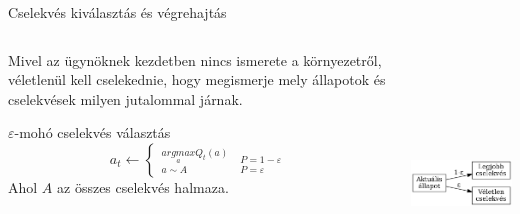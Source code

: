 \documentclass[english, aspectratio=169]{beamer}
\begin{document}
\begin{frame}{Cselekvés kiválasztás és végrehajtás}
\begin{columns}
\begin{column}{.5\textwidth}
Mivel az ügynöknek kezdetben nincs ismerete a környezetről, véletlenül kell cselekednie, hogy megismerje mely állapotok és cselekvések milyen jutalommal járnak.\par\smallskip
\begin{block}{$\varepsilon$-mohó cselekvés választás}
\[
a_{t}\leftarrow\begin{cases}
_{a\sim A}^{\underset{a}{argmax}Q_t(a)} & _{P=\varepsilon}^{P=1-\varepsilon}\end{cases}
\]
Ahol $A$ az összes cselekvés halmaza.
\end{block}
\end{column}
\begin{column}{.5\textwidth}
\begin{center}
\includegraphics[width=7cm, height=7cm, keepaspectratio]{graphs/reinforcement_8.png}
\end{center}
\end{column}
\end{columns}
\end{frame}
\end{document}
